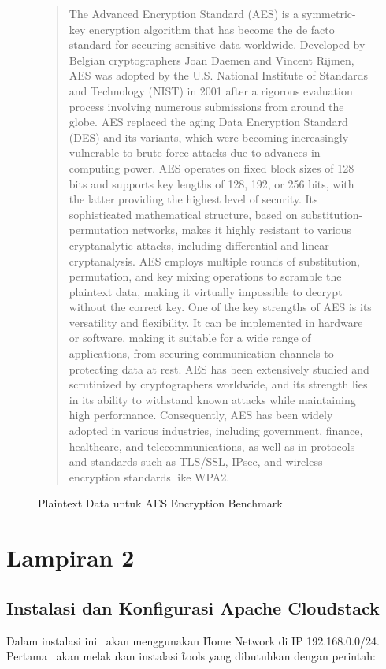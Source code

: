 \begin{figure}
    \begin{quote}
        The Advanced Encryption Standard (AES) is a symmetric-key encryption algorithm that has become the de facto standard for securing sensitive data worldwide. Developed by Belgian cryptographers Joan Daemen and Vincent Rijmen, AES was adopted by the U.S. National Institute of Standards and Technology (NIST) in 2001 after a rigorous evaluation process involving numerous submissions from around the globe. AES replaced the aging Data Encryption Standard (DES) and its variants, which were becoming increasingly vulnerable to brute-force attacks due to advances in computing power. AES operates on fixed block sizes of 128 bits and supports key lengths of 128, 192, or 256 bits, with the latter providing the highest level of security. Its sophisticated mathematical structure, based on substitution-permutation networks, makes it highly resistant to various cryptanalytic attacks, including differential and linear cryptanalysis. AES employs multiple rounds of substitution, permutation, and key mixing operations to scramble the plaintext data, making it virtually impossible to decrypt without the correct key. One of the key strengths of AES is its versatility and flexibility. It can be implemented in hardware or software, making it suitable for a wide range of applications, from securing communication channels to protecting data at rest. AES has been extensively studied and scrutinized by cryptographers worldwide, and its strength lies in its ability to withstand known attacks while maintaining high performance. Consequently, AES has been widely adopted in various industries, including government, finance, healthcare, and telecommunications, as well as in protocols and standards such as TLS/SSL, IPsec, and wireless encryption standards like WPA2.
    \end{quote}
    \caption{Plaintext Data untuk AES Encryption Benchmark}
    \label{fig:aesPlaintextData}
\end{figure}

\chapter*{Lampiran 2}

\section{Instalasi dan Konfigurasi Apache Cloudstack}
Dalam instalasi ini \saya\ akan menggunakan \f{Home Network} di IP 192.168.0.0/24. Pertama \saya\ akan melakukan instalasi \f{tools} yang dibutuhkan dengan perintah:


